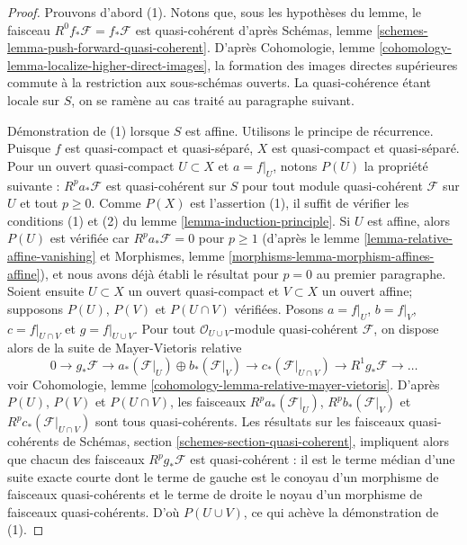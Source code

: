 \begin{proof}
Prouvons d'abord (1). Notons que, sous les hypothèses du lemme, le faisceau
$R^0f_*\mathcal{F} = f_*\mathcal{F}$ est quasi-cohérent d'après
Schémas, lemme \ref{schemes-lemma-push-forward-quasi-coherent}.
D'après
Cohomologie, lemme \ref{cohomology-lemma-localize-higher-direct-images},
la formation des images directes supérieures commute à la
restriction aux sous-schémas ouverts. La quasi-cohérence étant locale sur $S$,
on se ramène au cas traité au paragraphe suivant.

\medskip\noindent
Démonstration de (1) lorsque $S$ est affine. Utilisons le principe de récurrence.
Puisque $f$ est quasi-compact et quasi-séparé, $X$
est quasi-compact et quasi-séparé. Pour un ouvert quasi-compact $U \subset X$
et $a = f|_U$, notons $P(U)$ la propriété suivante :
$R^pa_*\mathcal{F}$ est quasi-cohérent sur $S$ pour tout module quasi-cohérent
$\mathcal{F}$ sur $U$ et tout $p \geq 0$. Comme $P(X)$ est l'assertion (1), il suffit
de vérifier les conditions (1) et (2) du lemme \ref{lemma-induction-principle}.
Si $U$ est affine, alors $P(U)$ est vérifiée car $R^pa_*\mathcal{F} = 0$ pour
$p \geq 1$ (d'après le lemme \ref{lemma-relative-affine-vanishing} et
Morphismes, lemme \ref{morphisms-lemma-morphism-affines-affine}),
et nous avons déjà établi le résultat pour $p = 0$ au premier
paragraphe. Soient ensuite $U \subset X$ un ouvert quasi-compact et $V \subset X$
un ouvert affine; supposons $P(U)$, $P(V)$ et $P(U \cap V)$ vérifiées.
Posons $a = f|_U$, $b = f|_V$, $c = f|_{U \cap V}$ et $g = f|_{U \cup V}$.
Pour tout $\mathcal{O}_{U \cup V}$-module quasi-cohérent $\mathcal{F}$,
on dispose alors de la suite de Mayer-Vietoris relative
$$
0 \to
g_*\mathcal{F} \to
a_*(\mathcal{F}|_U) \oplus b_*(\mathcal{F}|_V) \to
c_*(\mathcal{F}|_{U \cap V}) \to
R^1g_*\mathcal{F} \to \ldots
$$
voir Cohomologie, lemme \ref{cohomology-lemma-relative-mayer-vietoris}.
D'après $P(U)$, $P(V)$ et $P(U \cap V)$, les faisceaux
$R^pa_*(\mathcal{F}|_U)$, $R^pb_*(\mathcal{F}|_V)$ et
$R^pc_*(\mathcal{F}|_{U \cap V})$ sont tous quasi-cohérents.
Les résultats sur les faisceaux quasi-cohérents de
Schémas, section \ref{schemes-section-quasi-coherent},
impliquent alors que chacun des faisceaux
$R^pg_*\mathcal{F}$ est quasi-cohérent : il est le terme médian d'une suite exacte
courte dont le terme de gauche est le conoyau d'un morphisme
de faisceaux quasi-cohérents et le terme de droite le noyau d'un morphisme de faisceaux quasi-cohérents.
D'où $P(U \cup V)$, ce qui achève la démonstration de (1).


\end{proof}
